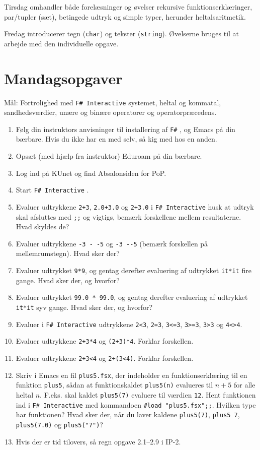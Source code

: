 \documentclass[a4paper,12pt]{article}
\newcommand{\fs}{\texttt{F\#} }
\newcommand{\fsi}{\texttt{F\# Interactive} }
\begin{document}
Tirsdag omhandler både forelæsninger og øvelser rekursive
funktionserklæringer, par/tupler (sæt), betingede udtryk og simple
typer, herunder heltalsaritmetik.

Fredag introducerer tegn (\texttt{char}) og tekster
(\texttt{string}). Øvelserne bruges til at arbejde med den
individuelle opgave.


\section{Mandagsopgaver}
\label{sec:mandagsopgaver}

Mål: Fortrolighed med \fsi systemet, heltal og kommatal,
sandhedsværdier, unære og binære operatorer og operatorpræcedens.

\begin{enumerate}[{1}M1]
\item Følg din instruktors anvisninger til installering af
  \fs, og Emacs på din bærbare. Hvis du ikke har en med selv, så kig
  med hos en anden.
\item Opsæt (med hjælp fra instruktor) Eduroam på din bærbare.
\item Log ind på KUnet og find Absalonsiden for PoP.
\item Start \fsi.
\item Evaluer udtrykkene \verb|2+3|, \verb|2.0+3.0| og \verb|2+3.0| i \fsi husk at udtryk skal afsluttes med \verb|;;| og vigtigs, bemærk forskellene mellem resultaterne. Hvad skyldes de?
\item Evaluer udtrykkene \verb|-3 - -5| og \verb|-3 --5| (bemærk forskellen på
  mellemrumstegn). Hvad sker der?
\item Evaluer udtrykket \verb|9*9|, og gentag derefter evaluering af
  udtrykket \verb|it*it| fire gange. Hvad sker der, og hvorfor?
\item Evaluer udtrykket \verb|99.0 * 99.0|, og gentag derefter
  evaluering af udtrykket \verb|it*it| syv gange. Hvad sker der, og hvorfor?
\item Evaluer i \fsi udtrykkene \verb|2<3|, \verb|2=3|, \verb|3<=3|, \verb|3>=3|, \verb|3>3| og \verb|4<>4|.
\item Evaluer udtrykkene \verb|2+3*4| og \verb|(2+3)*4|.  Forklar forskellen.
\item Evaluer udtrykkene \verb|2+3<4| og \verb|2+(3<4)|.  Forklar forskellen.
\item Skriv i Emacs en fil \texttt{plus5.fsx}, der indeholder en
  funktionserklæring til en funktion \verb|plus5|, sådan at funktionskaldet
  \verb|plus5(n)| evalueres til $n + 5$ for alle heltal $n$. F.eks. skal kaldet
  \verb|plus5(7)| evaluere til værdien \verb|12|. Hent funktionen ind i \fsi med
  kommandoen \verb|#load "plus5.fsx";;|. Hvilken type har funktionen? Hvad
  sker der, når du laver kaldene \verb|plus5(7)|, \verb|plus5 7|, \verb|plus5(7.0)| og
  \verb|plus5("7")|?
\item Hvis der er tid tilovers, så regn opgave 2.1--2.9 i IP-2.
\end{enumerate}
\end{document}
